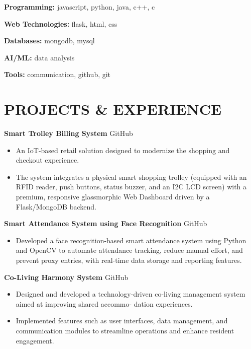 \documentclass[10pt,a4paper]{article}
\begin{document}
\textbf{Programming:} javascript, python, java, c++, c

\textbf{Web Technologies:} flask, html, css

\textbf{Databases:} mongodb, mysql

\textbf{AI/ML:} data analysis

\textbf{Tools:} communication, github, git


\section*{PROJECTS \& EXPERIENCE}

\noindent \textbf{Smart Trolley Billing System} \hfill GitHub\vspace{2pt}\\
\begin{itemize}[leftmargin=*, parsep=0pt, itemsep=2pt, topsep=2pt]
    \item An IoT-based retail solution designed to modernize the shopping and checkout experience.
    \item The system integrates a physical smart shopping trolley (equipped with an RFID reader, push buttons, status buzzer, and an I2C LCD screen) with a premium, responsive glassmorphic Web Dashboard driven by a Flask/MongoDB backend.
\end{itemize}

\noindent \textbf{Smart Attendance System using Face Recognition} \hfill GitHub\vspace{2pt}\\
\begin{itemize}[leftmargin=*, parsep=0pt, itemsep=2pt, topsep=2pt]
    \item Developed a face recognition-based smart attendance system using Python and OpenCV to automate attendance tracking, reduce manual effort, and prevent proxy entries, with real-time data storage and reporting features.
\end{itemize}

\noindent \textbf{Co-Living Harmony System} \hfill GitHub\vspace{2pt}\\
\begin{itemize}[leftmargin=*, parsep=0pt, itemsep=2pt, topsep=2pt]
    \item Designed and developed a technology-driven co-living management system aimed at improving shared accommo- dation experiences.
    \item Implemented features such as user interfaces, data management, and communication modules to streamline operations and enhance resident engagement.
\end{itemize}
\end{document}
